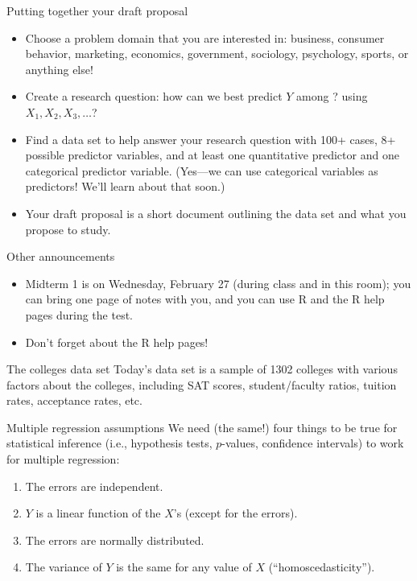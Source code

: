 \documentclass{beamer}\usepackage[]{graphicx}\usepackage[]{color}
\begin{document}
\begin{darkframes}
    \begin{frame}{Putting together your draft proposal}
      \begin{itemize}[<+->]
        \item Choose a problem domain that you are interested in: business, consumer behavior, marketing, economics, government, sociology, psychology, sports, or anything else!
        \item Create a research question: how can we best predict $Y$ among ? using $X_1, X_2, X_3, \ldots$?
        \item Find a data set to help answer your research question with 100+ cases, 8+ possible predictor variables, and at least one quantitative predictor and one categorical predictor variable. (Yes---we can use categorical variables as predictors! We'll learn about that soon.)
        \item Your draft proposal is a short document outlining the data set and what you propose to study.
      \end{itemize}
    \end{frame}

    \begin{frame}{Other announcements}
      \begin{itemize}[<+->]
        \item Midterm 1 is on Wednesday, February 27 (during class and in this room); you can bring one page of notes with you, and you can use R and the R help pages during the test.
        \item Don't forget about the R help pages!
      \end{itemize}
    \end{frame}

    \begin{frame}
    \end{frame}
    
    \begin{frame}{The colleges data set}
      Today's data set is a sample of 1302 colleges with various factors about the colleges, including SAT scores, student/faculty ratios, tuition rates, acceptance rates, etc.
    \end{frame}

    \begin{frame}{Multiple regression assumptions}
      We need (the same!) four things to be true for statistical inference (i.e., hypothesis tests, $p$-values, confidence intervals) to work for multiple regression:
      \pause
      \begin{enumerate}
        \item The errors are independent.
        \item $Y$ is a linear function of the $X$'s (except for the errors).
        \item The errors are normally distributed.
        \item The variance of $Y$ is the same for any value of $X$ (``homoscedasticity'').
      \end{enumerate}
    \end{frame}


\end{darkframes}
\end{document}
